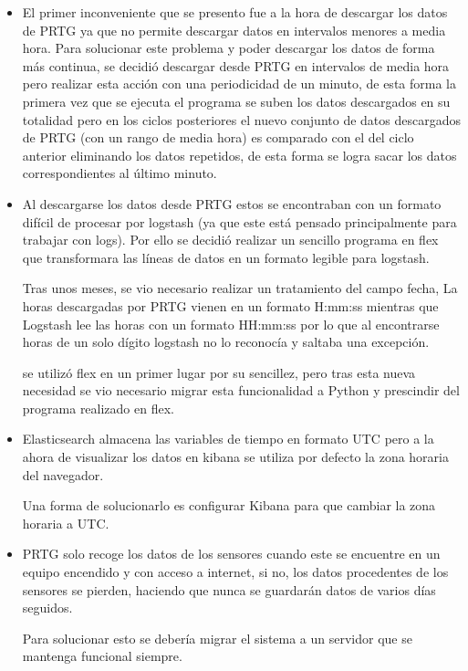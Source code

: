 \begin{itemize}
    \item El primer inconveniente que se presento fue a la hora de descargar los datos de PRTG ya que no permite descargar datos en intervalos menores a media hora. Para solucionar este problema y poder descargar los datos de forma más continua, se decidió descargar desde PRTG en intervalos de media hora pero realizar esta acción con una periodicidad de un minuto, de esta forma la primera vez que se ejecuta el programa se suben los datos descargados en su totalidad pero en los ciclos posteriores el nuevo conjunto de datos descargados de PRTG (con un rango de media hora) es comparado con el del ciclo anterior eliminando los datos repetidos, de esta forma se logra sacar los datos correspondientes al último minuto.
    
    
    \item Al descargarse los datos desde PRTG estos se encontraban con un formato difícil de procesar por logstash (ya que este está pensado principalmente para trabajar con logs). Por ello se decidió realizar un sencillo programa en flex que transformara las líneas de datos en un formato legible para logstash.
    
    Tras unos meses, se vio necesario realizar un tratamiento del campo fecha, La horas descargadas por PRTG vienen en un formato H:mm:ss mientras que Logstash lee las horas con un formato HH:mm:ss por lo que al encontrarse horas de un solo dígito logstash no lo reconocía y saltaba una excepción.
    
    se utilizó flex en un primer lugar por su sencillez, pero tras esta nueva necesidad se vio necesario migrar esta funcionalidad a Python y prescindir del programa realizado en flex.
    
    \item Elasticsearch almacena las variables de tiempo en formato UTC pero a la ahora de visualizar los datos en kibana se utiliza por defecto la zona horaria del navegador.
    
    Una forma de solucionarlo es configurar Kibana para que cambiar la zona horaria a UTC.
    
    \item PRTG solo recoge los datos de los sensores cuando este se encuentre en un equipo encendido y con acceso a internet, si no, los datos procedentes de los sensores se pierden, haciendo que nunca se guardarán datos de varios días seguidos.
    
    Para solucionar esto se debería migrar el sistema a un servidor que se mantenga funcional siempre.
\end{itemize}
